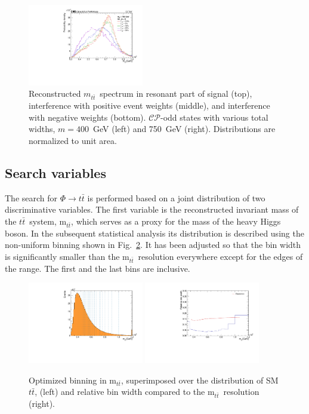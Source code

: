 \begin{figure}
  \includegraphics[width=0.45\textwidth]{fig/chapt5/sgnShapes/int/mtt_m750_neg.pdf}
  \caption{Reconstructed $m_{t\bar t}$~spectrum in resonant part of signal (top), interference with positive event weights (middle), and interference with negative weights (bottom). $\mathcal{CP}$-odd states with various total widths, $m = 400$~GeV (left) and 750~GeV (right). Distributions are normalized to unit area.}
  \label{Fig:MttSgnShapes}
\end{figure}

\subsection{Search variables}
\label{Sec:SearchVarsDef}
%
The search for $\Phi \rightarrow t\bar t$ is performed based on a joint distribution of two discriminative variables.
The first variable is the reconstructed invariant mass of the $t\bar t$~system, m$_{t\bar t}$, which serves as a proxy for the mass of the heavy Higgs boson.
In the subsequent statistical analysis its distribution is described using the non-uniform binning shown in Fig.~\ref{Fig:MttBinning}.
It has been adjusted so that the bin width is significantly smaller than the m$_{t\bar t}$~resolution everywhere except for the edges of the range.
The first and the last bins are inclusive.

\begin{figure}
  \centering
  \includegraphics[width=0.45\textwidth]{fig/chapt5/searchVars/mtt-bins.pdf}
  \includegraphics[width=0.45\textwidth]{fig/chapt5/searchVars/mtt-bin-width.pdf}
  \caption{Optimized binning in m$_{t\bar t}$, superimposed over the distribution of SM $t\bar{t}$, (left) and relative bin width compared to the m$_{t\bar t}$~resolution (right).}
  \label{Fig:MttBinning}
\end{figure}

